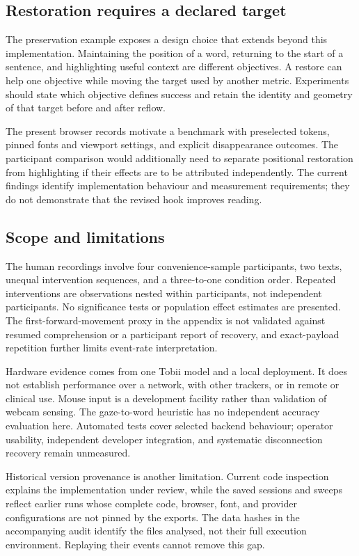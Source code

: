 \subsection{Restoration requires a declared target}

The preservation example exposes a design choice that extends beyond this implementation. Maintaining the position of a word, returning to the start of a sentence, and highlighting useful context are different objectives. A restore can help one objective while moving the target used by another metric. Experiments should state which objective defines success and retain the identity and geometry of that target before and after reflow.

The present browser records motivate a benchmark with preselected tokens, pinned fonts and viewport settings, and explicit disappearance outcomes. The participant comparison would additionally need to separate positional restoration from highlighting if their effects are to be attributed independently. The current findings identify implementation behaviour and measurement requirements; they do not demonstrate that the revised hook improves reading.

\subsection{Scope and limitations}

The human recordings involve four convenience-sample participants, two texts, unequal intervention sequences, and a three-to-one condition order. Repeated interventions are observations nested within participants, not independent participants. No significance tests or population effect estimates are presented. The first-forward-movement proxy in the appendix is not validated against resumed comprehension or a participant report of recovery, and exact-payload repetition further limits event-rate interpretation.

Hardware evidence comes from one Tobii model and a local deployment. It does not establish performance over a network, with other trackers, or in remote or clinical use. Mouse input is a development facility rather than validation of webcam sensing. The gaze-to-word heuristic has no independent accuracy evaluation here. Automated tests cover selected backend behaviour; operator usability, independent developer integration, and systematic disconnection recovery remain unmeasured.

Historical version provenance is another limitation. Current code inspection explains the implementation under review, while the saved sessions and sweeps reflect earlier runs whose complete code, browser, font, and provider configurations are not pinned by the exports. The data hashes in the accompanying audit identify the files analysed, not their full execution environment. Replaying their events cannot remove this gap.

